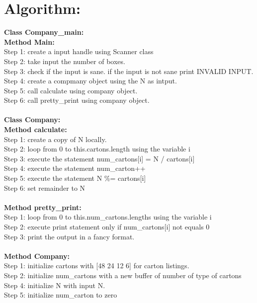 \section*{Algorithm:}
\textbf{\color{javapurple}Class Company\_main:}\\
\textbf{Method Main:}\\
Step 1: create a input handle using Scanner class\\
Step 2: take input the number of boxes.\\
Step 3: check if the input is sane. if the input is not sane print INVALID INPUT.\\
Step 4: create a compmany object using the N as intput.\\ 
Step 5: call calculate using company object.\\
Step 6: call pretty\_print using company object.\\\\
\textbf{\color{javapurple}Class Company:}\\
\textbf{Method calculate:}\\
Step 1: create a copy of N locally.\\
Step 2: loop from 0 to this.cartons.length using the variable i\\
Step 3: execute the statement num\_cartons[i] = N / cartons[i]\\
Step 4: execute the statement num\_carton++\\
Step 5: execute the statement N \%= cartons[i]\\
Step 6: set remainder to N\\\\
\textbf{Method pretty\_print:}\\
Step 1: loop from 0 to this.num\_cartons.lengths using the variable i\\
Step 2: execute print statement only if num\_cartons[i] not equals 0\\
Step 3: print the output in a fancy format.\\\\
\textbf{Method Company:}\\
Step 1: initialize cartons with [48 24 12 6] for carton listings.\\
Step 2: initialize num\_cartons with a new buffer of number of type of cartons\\
Step 4: initialize N with input N.\\
Step 5: initialize num\_carton to zero\\

